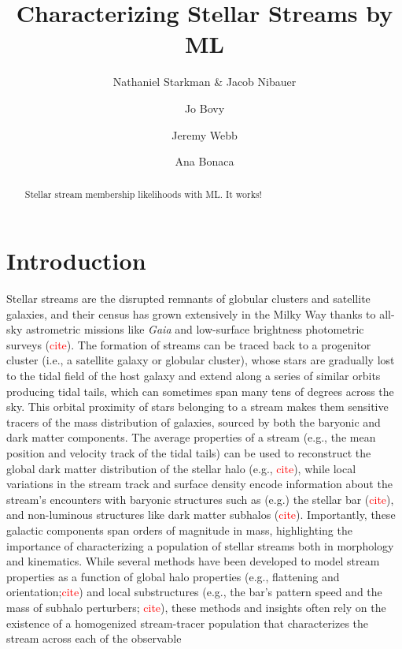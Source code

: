 \documentclass[twocolumn]{aastex631}
\newcommand{\TODO}[1]{{\textcolor{red}{#1}}}
\newcommand{\JN}[1]{\TODO{#1}}
\begin{document}
\title{Characterizing Stellar Streams by ML}

\author{Nathaniel Starkman \& Jacob Nibauer}
\author{Jo Bovy}
\author{Jeremy Webb}
\author{Ana Bonaca}

\begin{abstract}
    Stellar stream membership likelihoods with ML. It works!
\end{abstract}

\section{Introduction} \label{sec:intro}
    Stellar streams are the disrupted
    remnants of globular clusters and satellite galaxies, and their census has
    grown extensively in the Milky Way thanks to all-sky astrometric missions
    like {\it Gaia} and low-surface brightness photometric surveys (\JN{cite}).
    The formation of streams can be traced back to a progenitor cluster (i.e., a
    satellite galaxy or globular cluster), whose stars are gradually lost to the
    tidal field of the host galaxy and extend along a series of similar orbits
    producing tidal tails, which can sometimes span many tens of degrees across
    the sky. This orbital proximity of stars belonging to a stream makes them
    sensitive tracers of the mass distribution of galaxies, sourced by both the
    baryonic and dark matter components.
    The average properties of a stream (e.g., the mean position and velocity
    track of the tidal tails) can be used to reconstruct the global dark matter
    distribution of the stellar halo (e.g., \JN{cite}), while local variations
    in the stream track and surface density encode information about the
    stream's encounters with baryonic structures such as (e.g.) the stellar bar
    (\JN{cite}), and non-luminous structures like dark matter subhalos
    (\JN{cite}). Importantly, these galactic components span orders of magnitude
    in mass, highlighting the importance of characterizing a population of
    stellar streams both in morphology and kinematics. 
    While several methods have been developed to model stream properties as a
    function of global halo properties (e.g., flattening and
    orientation;\JN{cite}) and local substructures (e.g., the bar's pattern
    speed and the mass of subhalo perturbers; \JN{cite}), these methods and
    insights often rely on the existence of a homogenized stream-tracer
    population that characterizes the stream across each of the observable
\end{document}
